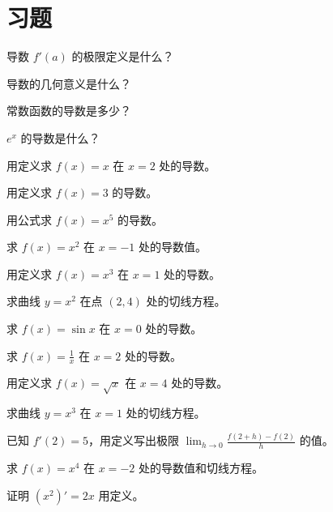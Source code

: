 \section{习题}

\begin{exercise}[0]
导数 \(f'(a)\) 的极限定义是什么？
\end{exercise}
\begin{exercise}[0]
导数的几何意义是什么？
\end{exercise}
\begin{exercise}[0]
常数函数的导数是多少？
\end{exercise}
\begin{exercise}[0]
\(e^x\) 的导数是什么？
\end{exercise}

\begin{exercise}[1]
用定义求 \(f(x)=x\) 在 \(x=2\) 处的导数。
\end{exercise}
\begin{exercise}[1]
用定义求 \(f(x)=3\) 的导数。
\end{exercise}
\begin{exercise}[1]
用公式求 \(f(x)=x^5\) 的导数。
\end{exercise}
\begin{exercise}[1]
求 \(f(x)=x^2\) 在 \(x=-1\) 处的导数值。
\end{exercise}

\begin{exercise}[2]
用定义求 \(f(x)=x^3\) 在 \(x=1\) 处的导数。
\end{exercise}
\begin{exercise}[2]
求曲线 \(y=x^2\) 在点 \((2,4)\) 处的切线方程。
\end{exercise}
\begin{exercise}[2]
求 \(f(x)=\sin x\) 在 \(x=0\) 处的导数。
\end{exercise}
\begin{exercise}[2]
求 \(f(x)=\frac{1}{x}\) 在 \(x=2\) 处的导数。
\end{exercise}

\begin{exercise}[3]
用定义求 \(f(x)=\sqrt{x}\) 在 \(x=4\) 处的导数。
\end{exercise}
\begin{exercise}[3]
求曲线 \(y=x^3\) 在 \(x=1\) 处的切线方程。
\end{exercise}
\begin{exercise}[3]
已知 \(f'(2)=5\)，用定义写出极限 \(\lim_{h\to0} \frac{f(2+h)-f(2)}{h}\) 的值。
\end{exercise}
\begin{exercise}[3]
求 \(f(x)=x^4\) 在 \(x=-2\) 处的导数值和切线方程。
\end{exercise}
\begin{exercise}[3]
证明 \((x^2)' = 2x\) 用定义。
\end{exercise}

